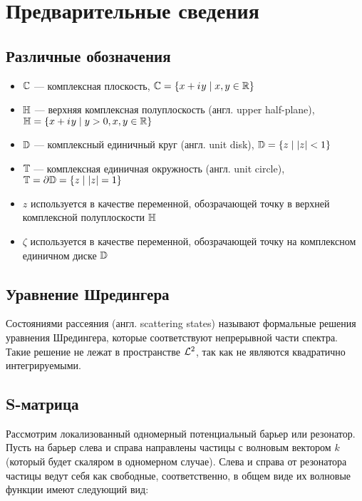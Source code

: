 \chapter{Предварительные сведения}

\section{Различные обозначения}
\begin{itemize}
\item $\mathbb{C}$ — комплексная плоскость, $\mathbb{C} = \{ x + {i\mkern1mu} y \mid x, y \in \mathbb{R} \}$ 
\item $\mathbb{H}$ — верхняя комплексная полуплоскость (англ. upper half-plane), $\mathbb{H} = \{ x + {i\mkern1mu} y \mid y > 0, x, y \in \mathbb{R} \}$
\item $\mathbb{D}$ — комплексный единичный круг (англ. unit disk), $\mathbb{D} = \{ z \mid \abs{z} < 1 \}$
\item $\mathbb{T}$ — комплексная единичная окружность (англ. unit circle), $\mathbb{T} = \partial \mathbb{D} =  \{z \mid \abs{z} = 1 \}$
\item $z$ используется в качестве переменной, обозрачающей точку в верхней комплексной полуплоскости $\mathbb{H}$
\item $\zeta$ используется в качестве переменной, обозрачающей точку на комплексном единичном диске $\mathbb{D}$
\end{itemize}

\section{Уравнение Шредингера}



Состояниями рассеяния (англ. scattering states) называют формальные решения уравнения Шредингера, которые соответствуют непрерывной части спектра. Такие решение не лежат в пространстве $\mathcal{L}^2$, так как не являются квадратично интегрируемыми.

\section{S-матрица}


Рассмотрим локализованный одномерный потенциальный барьер или резонатор. Пусть на барьер слева и справа направлены частицы с волновым вектором $k$ (который будет скаляром в одномерном случае). Слева и справа от резонатора частицы ведут себя как свободные, соответственно, в общем виде их волновые функции имеют следующий вид:

